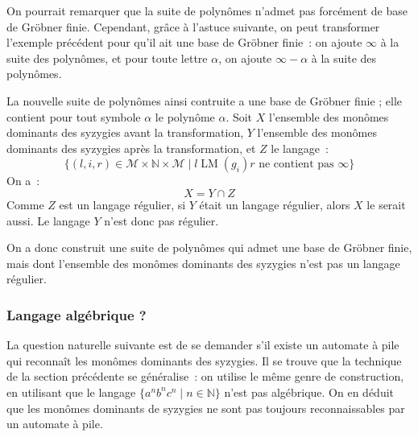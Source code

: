 \documentclass{article}
\newcommand{\N}{\mathbb{N}}
\newcommand{\M}{\mathcal{M}}
\DeclareMathOperator{\LM}{LM}
\begin{document}
On pourrait remarquer que la suite de polynômes n'admet pas forcément de base de Gröbner finie.
Cependant, grâce à l'astuce suivante, on peut transformer l'exemple précédent pour qu'il ait une base de Gröbner finie~: on ajoute $\infty$ à la suite des polynômes, et pour toute lettre $\alpha$, on ajoute $\infty - \alpha$ à la suite des polynômes.

La nouvelle suite de polynômes ainsi contruite a une base de Gröbner finie ; elle contient pour tout symbole $\alpha$ le polynôme $\alpha$.
Soit $X$ l'ensemble des monômes dominants des syzygies avant la transformation, $Y$ l'ensemble des monômes dominants des syzygies après la transformation, et $Z$ le langage~:
$$\{(l, i, r) \in \M \times \N \times \M \;|\; l \LM(g_i) r \mbox{ ne contient pas } \infty\}$$
On a~:
$$X = Y \cap Z$$
Comme $Z$ est un langage régulier, si $Y$ était un langage régulier, alors $X$ le serait aussi.
Le langage $Y$ n'est donc pas régulier.

On a donc construit une suite de polynômes qui admet une base de Gröbner finie, mais dont l'ensemble des monômes dominants des syzygies n'est pas un langage régulier.

\subsubsection*{Langage algébrique ?}

La question naturelle suivante est de se demander s'il existe un automate à pile qui reconnaît les monômes dominants des syzygies.
Il se trouve que la technique de la section précédente se généralise~: on utilise le même genre de construction, en utilisant que le langage $\{a^nb^nc^n \;|\; n \in \N\}$ n'est pas algébrique.
On en déduit que les monômes dominants de syzygies ne sont pas toujours reconnaissables par un automate à pile.

\nocite{*}
\printbibliography
\end{document}
